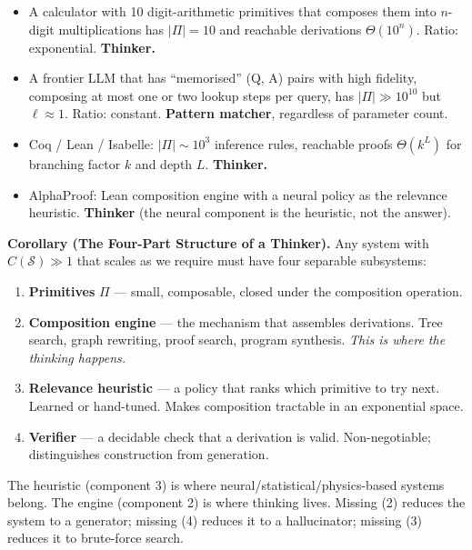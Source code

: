 \documentclass[
  11pt,
  a4paper,
]{article}
\providecommand{\tightlist}{%
  \setlength{\itemsep}{0pt}\setlength{\parskip}{0pt}}
\begin{document}
\begin{itemize}
\tightlist
\item
  A calculator with 10 digit-arithmetic primitives that composes them
  into \(n\)-digit multiplications has \(|\Pi| = 10\) and reachable
  derivations \(\Theta(10^n)\). Ratio: exponential. \textbf{Thinker.}
\item
  A frontier LLM that has ``memorised'' (Q, A) pairs with high fidelity,
  composing at most one or two lookup steps per query, has
  \(|\Pi| \gg 10^{10}\) but \(\ell \approx 1\). Ratio: constant.
  \textbf{Pattern matcher}, regardless of parameter count.
\item
  Coq / Lean / Isabelle: \(|\Pi| \sim 10^3\) inference rules, reachable
  proofs \(\Theta(k^L)\) for branching factor \(k\) and depth \(L\).
  \textbf{Thinker.}
\item
  AlphaProof: Lean composition engine with a neural policy as the
  relevance heuristic. \textbf{Thinker} (the neural component is the
  heuristic, not the answer).
\end{itemize}

\textbf{Corollary (The Four-Part Structure of a Thinker).} Any system
with \(C(\mathcal{S}) \gg 1\) that scales as we require must have four
separable subsystems:

\begin{enumerate}
\def\labelenumi{\arabic{enumi}.}
\tightlist
\item
  \textbf{Primitives} \(\Pi\) --- small, composable, closed under the
  composition operation.
\item
  \textbf{Composition engine} --- the mechanism that assembles
  derivations. Tree search, graph rewriting, proof search, program
  synthesis. \emph{This is where the thinking happens.}
\item
  \textbf{Relevance heuristic} --- a policy that ranks which primitive
  to try next. Learned or hand-tuned. Makes composition tractable in an
  exponential space.
\item
  \textbf{Verifier} --- a decidable check that a derivation is valid.
  Non-negotiable; distinguishes construction from generation.
\end{enumerate}

The heuristic (component 3) is where neural/statistical/physics-based
systems belong. The engine (component 2) is where thinking lives.
Missing (2) reduces the system to a generator; missing (4) reduces it to
a hallucinator; missing (3) reduces it to brute-force search.
\end{document}
